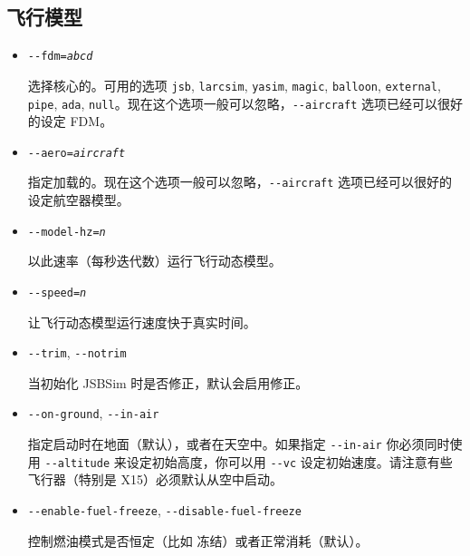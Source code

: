 \ifchinese
{
  \subsection{飞行模型}\label{flight dynamics model}
  \begin{itemize}
  \item{\texttt{-$ $-fdm={\it abcd}}}

  选择核心的。可用的选项 \texttt{jsb}, \texttt{larcsim}, \texttt{yasim}, \texttt{magic}, \texttt{balloon}, \texttt{external}, \texttt{pipe}, \texttt{ada}, \texttt{null}。现在这个选项一般可以忽略，\texttt{-$ $-aircraft} 选项已经可以很好的设定 FDM。

\item{\texttt{-$ $-aero={\it aircraft}}}

  指定加载的。现在这个选项一般可以忽略，\texttt{-$ $-aircraft} 选项已经可以很好的设定航空器模型。

 \item{\texttt{-$ $-model-hz={\it n}}}
  
  以此速率（每秒迭代数）运行飞行动态模型。

 \item{\texttt{-$ $-speed={\it n}}}

  让飞行动态模型运行速度快于真实时间。

\item{\texttt{-$ $-trim}, \texttt{-$ $-notrim}}

 当初始化 JSBSim 时是否修正，默认会启用修正。

\item{\texttt{-$ $-on-ground}, \texttt{-$ $-in-air}}

 指定启动时在地面（默认），或者在天空中。如果指定 \texttt{-$ $-in-air} 你必须同时使用 \texttt{-$ $-altitude} 来设定初始高度，你可以用 \texttt{-$ $-vc} 设定初始速度。请注意有些飞行器（特别是 X15）必须默认从空中启动。

  \item{\texttt{-$ $-enable-fuel-freeze}, \texttt{-$ $-disable-fuel-freeze}}
 
 控制燃油模式是否恒定（比如 冻结）或者正常消耗（默认）。
 
\end{itemize}
}
\fi


